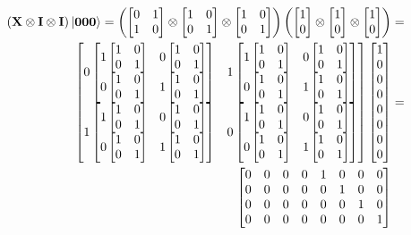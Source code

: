 \begin{figure}[H]
    \centering
    \begin{align*}
        \left(\qtx\otimes\qti\otimes\qti\right)\ket{\qtz\qtz\qtz}=\left(\qx\otimes\qi\otimes\qi\right)\left(\qz\otimes\qz\otimes\qz\right)&= \\
        \begin{bmatrix}
            0
            \begin{bmatrix}
                1 \qi & 0 \qi\\
                0 \qi & 1 \qi\\
            \end{bmatrix}
            & 1
            \begin{bmatrix}
                1 \qi & 0 \qi\\
                0 \qi & 1 \qi\\
           \end{bmatrix}\\
           1 
           \begin{bmatrix}
               1 \qi & 0 \qi\\
                0 \qi & 1 \qi\\
            \end{bmatrix}
            & 0
            \begin{bmatrix}
                1 \qi & 0 \qi\\
                0 \qi & 1 \qi
            \end{bmatrix}\\ 
        \end{bmatrix}
        \begin{bmatrix}
            1\\
            0\\
            0\\
            0\\
            0\\
            0\\
            0\\
            0
        \end{bmatrix}
        &=\\
        \begin{bmatrix}
            0 & 0 & 0 & 0 & 1 & 0 & 0 & 0\\
            0 & 0 & 0 & 0 & 0 & 1 & 0 & 0\\
            0 & 0 & 0 & 0 & 0 & 0 & 1 & 0\\
            0 & 0 & 0 & 0 & 0 & 0 & 0 & 1\\

\end{bmatrix}
\end{align*}
\end{figure}
